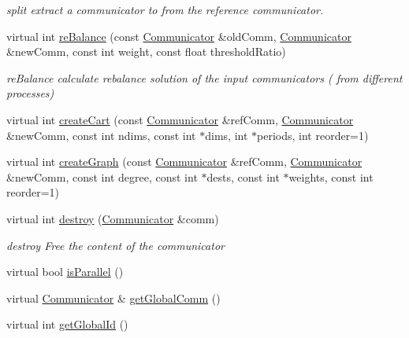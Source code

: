 \begin{DoxyCompactItemize}
\begin{DoxyCompactList}\small\item\em split extract a communicator to from the reference communicator. \item\end{DoxyCompactList}\item 
virtual int \hyperlink{classHSF_1_1CommunicationManager_a6639239769aede35bcaa47b5b6aeb2b1}{reBalance} (const \hyperlink{classHSF_1_1Communicator}{Communicator} \&oldComm, \hyperlink{classHSF_1_1Communicator}{Communicator} \&newComm, const int weight, const float thresholdRatio)
\begin{DoxyCompactList}\small\item\em reBalance calculate rebalance solution of the input communicators ( from different processes) \item\end{DoxyCompactList}\item 
virtual int \hyperlink{classHSF_1_1CommunicationManager_a1128786fe9a8887c1e02f00bcabcd0a6}{createCart} (const \hyperlink{classHSF_1_1Communicator}{Communicator} \&refComm, \hyperlink{classHSF_1_1Communicator}{Communicator} \&newComm, const int ndims, const int $\ast$dims, int $\ast$periods, int reorder=1)
\item 
virtual int \hyperlink{classHSF_1_1CommunicationManager_a6740c20953c04b2283a830b8f1226d9f}{createGraph} (const \hyperlink{classHSF_1_1Communicator}{Communicator} \&refComm, \hyperlink{classHSF_1_1Communicator}{Communicator} \&newComm, const int degree, const int $\ast$dests, const int $\ast$weights, const int reorder=1)
\item 
virtual int \hyperlink{classHSF_1_1CommunicationManager_ab1ce47822ae286b8e08be0a796f3feea}{destroy} (\hyperlink{classHSF_1_1Communicator}{Communicator} \&comm)
\begin{DoxyCompactList}\small\item\em destroy Free the content of the communicator \item\end{DoxyCompactList}\item 
virtual bool \hyperlink{classHSF_1_1CommunicationManager_a1a8ea32f81aa56766552980fa3825127}{isParallel} ()
\item 
virtual \hyperlink{classHSF_1_1Communicator}{Communicator} \& \hyperlink{classHSF_1_1CommunicationManager_ac71fa06c7568af39df109ffa32a5c444}{getGlobalComm} ()
\item 
virtual int \hyperlink{classHSF_1_1CommunicationManager_aaba8e09de5ff7ff523875e8d0a24c03e}{getGlobalId} ()

\end{DoxyCompactItemize}
